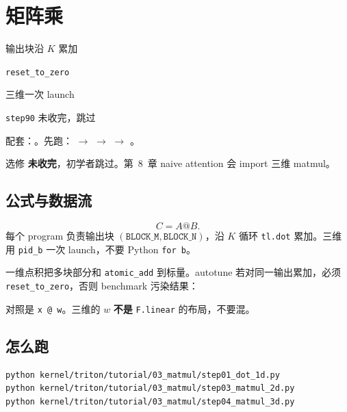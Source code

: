 \chapter{矩阵乘}

\begin{introduction}
  \item 输出块沿 $K$ 累加
  \item \texttt{reset\_to\_zero}
  \item 三维一次 launch
  \item \texttt{step90} 未收完，跳过
\end{introduction}

配套：。先跑： $\to$  $\to$  $\to$ 。

\begin{note}
选修  \textbf{未收完}，初学者跳过。第~8~章 naive attention 会 import 三维 matmul。
\end{note}

\section{公式与数据流}

\[
C=A@B.
\]
每个 program 负责输出块 $(\texttt{BLOCK\_M},\texttt{BLOCK\_N})$，沿 $K$ 循环 \texttt{tl.dot} 累加。三维用 \texttt{pid\_b} 一次 launch，不要 Python \texttt{for b}。

\figmatmul


一维点积把多块部分和 \texttt{atomic\_add} 到标量。autotune 若对同一输出累加，必须 \texttt{reset\_to\_zero}，否则 benchmark 污染结果：


对照是 \texttt{x @ w}。三维的 $w$ \textbf{不是} \texttt{F.linear} 的布局，不要混。

\section{怎么跑}

\begin{runcmd}
\begin{lstlisting}[style=shell]
python kernel/triton/tutorial/03_matmul/step01_dot_1d.py
python kernel/triton/tutorial/03_matmul/step03_matmul_2d.py
python kernel/triton/tutorial/03_matmul/step04_matmul_3d.py
\end{lstlisting}
\end{runcmd}

